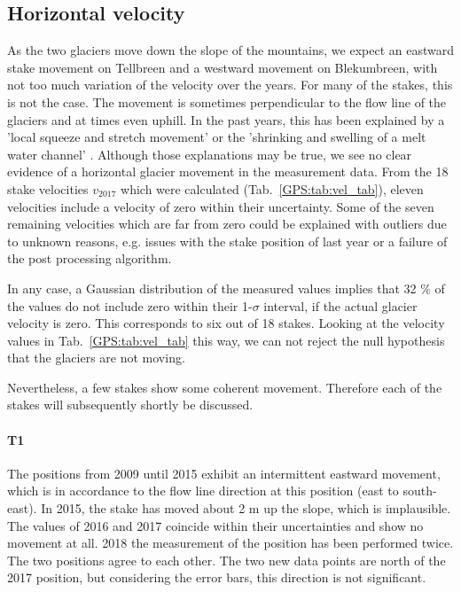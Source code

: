 
\subsection{Horizontal velocity}

As the two glaciers move down the slope of the mountains,
we expect an eastward stake movement on Tellbreen and
a westward movement on Blekumbreen, with not too much variation of the velocity over the years.
For many of the stakes, this is not the case.
The movement is sometimes perpendicular to the flow line of the glaciers
and at times even uphill.
In the past years, this has been explained by a 'local squeeze and stretch movement' \citep{rep2016} or
the 'shrinking and swelling of a melt water channel' \citep{rep2017}.
Although those explanations may be true, we see no clear evidence of a horizontal glacier movement in the measurement data.
From the 18 stake velocities $v_{2017}$ which were calculated (Tab.~\ref{GPS:tab:vel_tab}),
eleven velocities include a velocity of zero within their uncertainty.
Some of the seven remaining velocities which are far from zero could be explained with outliers due to unknown reasons, e.g.
issues with the stake position of last year or a failure of the post processing algorithm.

In any case, a Gaussian distribution of the measured values implies that 32 \% of the values
do not include zero within their 1-$\sigma$ interval, if the actual glacier velocity is zero.
This corresponds to six out of 18 stakes.
Looking at the velocity values in Tab.~\ref{GPS:tab:vel_tab} this way, we can not reject the null hypothesis that the glaciers are not moving.

Nevertheless, a few stakes show some coherent movement.
Therefore each of the stakes will subsequently shortly be discussed.

\paragraph{T1}
The positions from 2009 until 2015 exhibit an intermittent eastward movement,
which is in accordance to the flow line direction at this position (east to south-east).
In 2015, the stake has moved about 2 m up the slope, which is implausible.
The values of 2016 and 2017 coincide within their uncertainties and show no movement at all.
2018 the measurement of the position has been performed twice.
The two positions agree to each other.
The two new data points are north of the 2017 position,
but considering the error bars, this direction is not significant.

